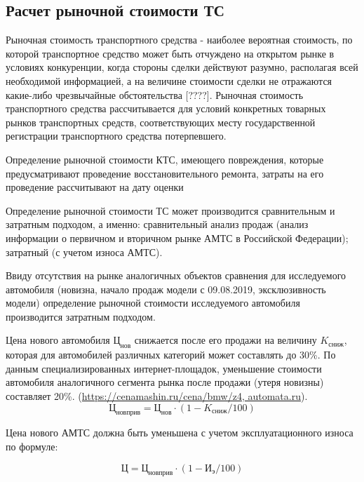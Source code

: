 \subsection{Расчет рыночной стоимости ТС}


\par \indent Рыночная стоимость транспортного средства - наиболее вероятная стоимость, по которой транспортное средство может быть отчуждено на открытом рынке в условиях конкуренции, когда стороны сделки действуют разумно, располагая всей необходимой информацией, а на величине стоимости сделки не отражаются какие-либо чрезвычайные обстоятельства [????]. Рыночная стоимость транспортного средства  рассчитывается  для условий конкретных товарных рынков транспортных средств, соответствующих месту государственной регистрации транспортного средства потерпевшего.
\par Определение рыночной стоимости КТС, имеющего повреждения, которые предусматривают проведение восстановительного ремонта, затраты на его проведение рассчитывают на дату оценки %
\par Определение рыночной стоимости ТС может производится сравнительным и затратным подходом, а именно:  сравнительный анализ продаж (анализ информации о первичном и вторичном рынке АМТС в Российской Федерации);  затратный (с учетом износа АМТС).
\par Ввиду отсутствия на рынке аналогичных объектов сравнения для исследуемого автомобиля (новизна, начало продаж модели с 09.08.2019, эксклюзивность модели) определение рыночной стоимости исследуемого автомобиля производится затратным подходом.

\par Цена нового автомобиля  $  \text{Ц}_\text{нов} $ снижается после его продажи на величину $ K_\text{сниж} $, которая для автомобилей различных категорий может составлять до 30\%. По данным специализированных интернет-площадок, уменьшение стоимости автомобиля аналогичного сегмента рынка после продажи (утеря новизны) составляет 20\%. (\url{https://cenamashin.ru/cena/bmw/z4, automata.ru}).
\begin{equation}\label{f:r}
\text{Ц}_\text{новприв} = \text{Ц}_\text{нов} \cdot (1-K_\text{сниж}/100)
\end{equation}

Цена нового АМТС   должна быть уменьшена с учетом эксплуатационного износа   по формуле:

\begin{equation}\label{f:n}
\text{Ц} = \text{Ц}_\text{новприв} \cdot (1-\text{И}_\text{э}/100)
\end{equation}

